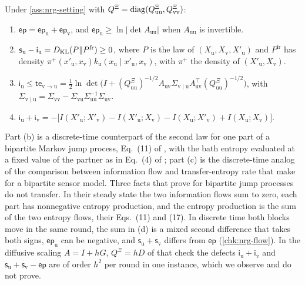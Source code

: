 \begin{theorem}\label{thm:nrg-flow}
Under \cref{ass:nrg-setting} with $Q^{\Xi}=\operatorname{diag}(Q^{\Xi}_{\mathrm{uu}},Q^{\Xi}_{\mathrm{vv}})$:
\begin{enumerate}
\item[(a)] $\mathsf{ep}=\mathsf{ep}_{\mathrm u}+\mathsf{ep}_{\mathrm v}$, and $\mathsf{ep}_{\mathrm u}\ge\ln\vert\det A_{\mathrm{uu}}\vert$ when $A_{\mathrm{uu}}$ is invertible.
\item[(b)] $\mathsf s_{\mathrm u}-\mathsf i_{\mathrm u}=D_{\mathrm{KL}}(P\Vert P^{\mathrm{fr}})\ge0$, where $P$ is the law of $(X_{\mathrm u},X_{\mathrm v},X'_{\mathrm u})$ and $P^{\mathrm{fr}}$ has density $\pi^+(x'_{\mathrm u},x_{\mathrm v})k_{\mathrm u}(x_{\mathrm u}\mid x'_{\mathrm u},x_{\mathrm v})$, with $\pi^+$ the density of $(X'_{\mathrm u},X_{\mathrm v})$.
\item[(c)] $\mathsf i_{\mathrm u}\le\mathsf{te}_{\mathrm v\to\mathrm u}=\tfrac12\ln\det\bigl(I+(Q^{\Xi}_{\mathrm{uu}})^{-1/2}A_{\mathrm{uv}}\Sigma_{\mathrm v\mid\mathrm u}A_{\mathrm{uv}}^\top(Q^{\Xi}_{\mathrm{uu}})^{-1/2}\bigr)$, with $\Sigma_{\mathrm v\mid\mathrm u}=\Sigma_{\mathrm{vv}}-\Sigma_{\mathrm{vu}}\Sigma_{\mathrm{uu}}^{-1}\Sigma_{\mathrm{uv}}$.
\item[(d)] $\mathsf i_{\mathrm u}+\mathsf i_{\mathrm v}=-\bigl[I(X'_{\mathrm u};X'_{\mathrm v})-I(X'_{\mathrm u};X_{\mathrm v})-I(X_{\mathrm u};X'_{\mathrm v})+I(X_{\mathrm u};X_{\mathrm v})\bigr]$.
\end{enumerate}
\end{theorem}

Part (b) is a discrete-time counterpart of the second law for one part of a bipartite Markov jump process, Eq.~(11) of \citet{horowitz2014thermodynamics}, with the bath entropy evaluated at a fixed value of the partner as in Eq.~(4) of \citet{ito2013information}; part (c) is the discrete-time analog of the comparison between information flow and transfer-entropy rate that \citet{hartich2014stochastic} make for a bipartite sensor model. Three facts that \citet{horowitz2014thermodynamics} prove for bipartite jump processes do not transfer. In their steady state the two information flows sum to zero, each part has nonnegative entropy production, and the entropy production is the sum of the two entropy flows, their Eqs.~(11) and (17). In discrete time both blocks move in the same round, the sum in (d) is a mixed second difference that takes both signs, $\mathsf{ep}_{\mathrm u}$ can be negative, and $\mathsf s_{\mathrm u}+\mathsf s_{\mathrm v}$ differs from $\mathsf{ep}$ (\cref{chk:nrg-flow}). In the diffusive scaling $A=I+hG$, $Q^{\Xi}=hD$ of that check the defects $\mathsf i_{\mathrm u}+\mathsf i_{\mathrm v}$ and $\mathsf s_{\mathrm u}+\mathsf s_{\mathrm v}-\mathsf{ep}$ are of order $h^2$ per round in one instance, which we observe and do not prove.

